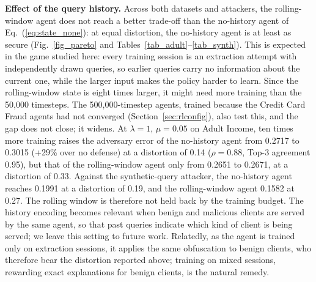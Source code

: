 \documentclass[conference]{IEEEtran}
\DeclareRobustCommand{\rev}[1]{#1}
\DeclareRobustCommand{\revnew}[1]{#1}
\begin{document}
\rev{\textbf{Effect of the query history.} Across both datasets and attackers, the rolling-window agent does not reach a better trade-off than the \revnew{no-history agent of Eq.~(\ref{eq:state_none})}: at equal distortion, the no-history agent is at least as secure (Fig.~\ref{fig_pareto}\revnew{ and Tables~\ref{tab_adult}--\ref{tab_synth}}). This is expected in the game studied here: every training session is an extraction attempt with independently drawn queries, so earlier queries carry no information about the current one, while the larger input makes the policy harder to learn. \revnew{Since the rolling-window state is eight times larger, it might need more training than the 50,000 timesteps. The 500,000-timestep agents, trained because the Credit Card Fraud agents had not converged (Section~\ref{sec:rlconfig}), also test this, and the gap does not close; it widens. At $\lambda=1$, $\mu=0.05$ on Adult Income, ten times more training raises the adversary error of the no-history agent from 0.2717 to 0.3015 (+29\% over no defense) at a distortion of 0.14 ($\rho=0.88$, Top-3 agreement 0.95), but that of the rolling-window agent only from 0.2651 to 0.2671, at a distortion of 0.33. Against the synthetic-query attacker, the no-history agent reaches 0.1991 at a distortion of 0.19, and the rolling-window agent 0.1582 at 0.27. The rolling window is therefore not held back by the training budget.} The history encoding becomes relevant when benign and malicious clients are served by the same agent, so that past queries indicate which kind of client is being served; we leave this setting to future work. Relatedly, as the agent is trained only on extraction sessions, it applies the same obfuscation to benign clients, who therefore bear the distortion reported above; training on mixed sessions, rewarding exact explanations for benign clients, is the natural remedy.}
\end{document}
